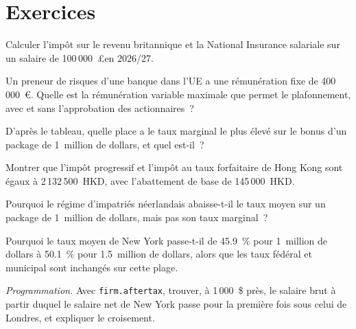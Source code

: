 \section{Exercices}

\begin{exercise}[$\star$]\label{exo:in:pay-regulation-and-tax-by-location:1}
Calculer l'impôt sur le revenu britannique et la National Insurance salariale sur un salaire de 100\,000~\pounds en 2026/27.
\end{exercise}

\begin{exercise}[$\star$]\label{exo:in:pay-regulation-and-tax-by-location:2}
Un preneur de risques d'une banque dans l'UE a une rémunération fixe de 400\,000~\euro. Quelle est la rémunération variable maximale que permet le plafonnement, avec et sans
l'approbation des actionnaires~?
\end{exercise}

\begin{exercise}[$\star$]\label{exo:in:pay-regulation-and-tax-by-location:3}
D'après le tableau, quelle place a le taux marginal le plus élevé sur le bonus d'un package de 1~million de dollars, et quel est-il~?
\end{exercise}

\begin{exercise}[$\star\star$]\label{exo:in:pay-regulation-and-tax-by-location:4}
Montrer que l'impôt progressif et l'impôt au taux forfaitaire de Hong Kong sont égaux à 2\,132\,500~HKD, avec l'abattement de base de
145\,000~HKD.
\end{exercise}

\begin{exercise}[$\star\star$]\label{exo:in:pay-regulation-and-tax-by-location:5}
Pourquoi le régime d'impatriés néerlandais abaisse-t-il le taux moyen sur un package de 1~million de dollars, mais pas son taux marginal~?
\end{exercise}

\begin{exercise}[$\star\star$]\label{exo:in:pay-regulation-and-tax-by-location:6}
Pourquoi le taux moyen de New York passe-t-il de 45.9~\% pour 1~million de dollars à 50.1~\% pour 1.5~million de dollars, alors que les taux fédéral et municipal
sont inchangés sur cette plage.
\end{exercise}

\begin{exercise}[$\star\star\star$]\label{exo:in:pay-regulation-and-tax-by-location:7}
\emph{Programmation.} Avec \texttt{firm.aftertax}, trouver, à 1\,000~\$ près, le salaire brut à partir duquel le salaire net de New York
passe pour la première fois sous celui de Londres, et expliquer le croisement.
\end{exercise}

